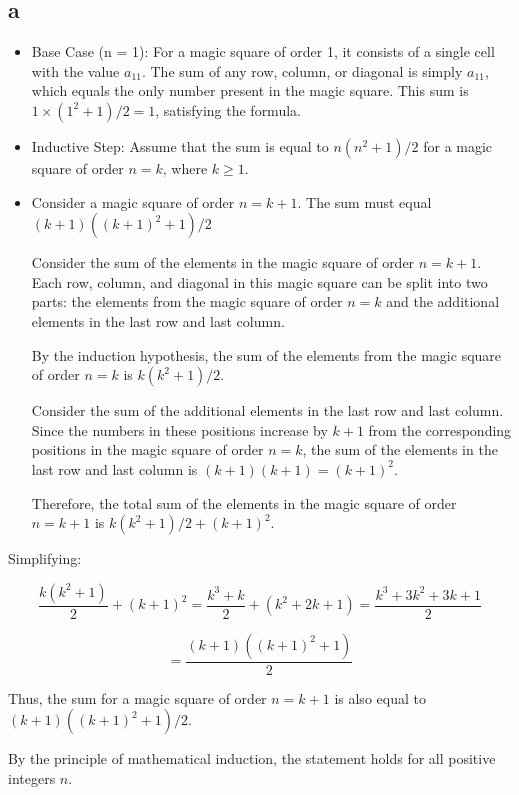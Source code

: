 \documentclass{article}
\begin{document}
\subsection*{a}
\begin{itemize}
    \item Base Case (n = 1):
          For a magic square of order 1, it consists of a single cell with the value \( a_{11} \). The sum of any row, column, or diagonal is simply \( a_{11} \), which equals the only number present in the magic square. This sum is \( 1 \times (1^2 + 1)/2 = 1 \), satisfying the formula.

    \item Inductive Step:
          Assume that the sum is equal to \( n(n^2 + 1)/2 \) for a magic square of order \( n = k \), where \( k \geq 1 \).

    \item Consider a magic square of order \( n = k + 1 \). The sum must equal \( (k + 1)((k + 1)^2 + 1)/2 \)

          Consider the sum of the elements in the magic square of order \( n = k + 1 \). Each row, column, and diagonal in this magic square can be split into two parts: the elements from the magic square of order \( n = k \) and the additional elements in the last row and last column.

          By the induction hypothesis, the sum of the elements from the magic square of order \( n = k \) is \( k(k^2 + 1)/2 \).

          Consider the sum of the additional elements in the last row and last column. Since the numbers in these positions increase by \( k + 1 \) from the corresponding positions in the magic square of order \( n = k \), the sum of the elements in the last row and last column is \( (k + 1)(k + 1) = (k + 1)^2 \).

          Therefore, the total sum of the elements in the magic square of order \( n = k + 1 \) is \( k(k^2 + 1)/2 + (k + 1)^2 \).
\end{itemize}

Simplifying:

\[ \frac{k(k^2 + 1)}{2} + (k + 1)^2 = \frac{k^3 + k}{2} + (k^2 + 2k + 1) = \frac{k^3 + 3k^2 + 3k + 1}{2} \]

\[ = \frac{(k + 1)((k + 1)^2 + 1)}{2} \]

Thus, the sum for a magic square of order \( n = k + 1 \) is also equal to \( (k + 1)((k + 1)^2 + 1)/2 \).

By the principle of mathematical induction, the statement holds for all positive integers \( n \).
\end{document}
